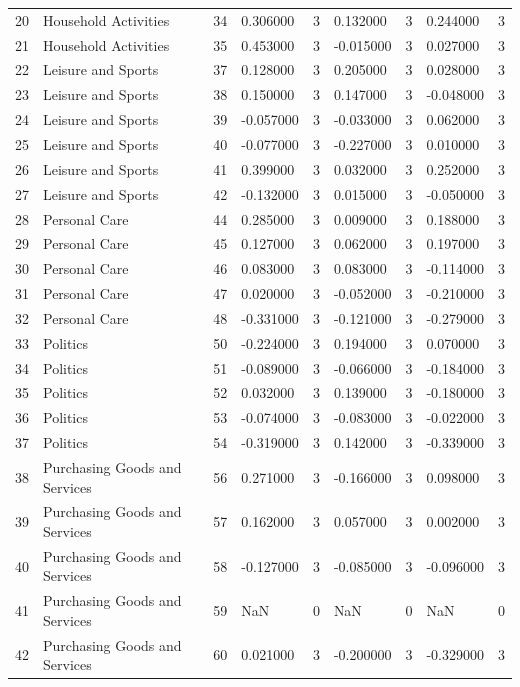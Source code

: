 \begin{tabular}{lllllllll}
20 & Household Activities & 34 & 0.306000 & 3 & 0.132000 & 3 & 0.244000 & 3 \\
21 & Household Activities & 35 & 0.453000 & 3 & -0.015000 & 3 & 0.027000 & 3 \\
22 & Leisure and Sports & 37 & 0.128000 & 3 & 0.205000 & 3 & 0.028000 & 3 \\
23 & Leisure and Sports & 38 & 0.150000 & 3 & 0.147000 & 3 & -0.048000 & 3 \\
24 & Leisure and Sports & 39 & -0.057000 & 3 & -0.033000 & 3 & 0.062000 & 3 \\
25 & Leisure and Sports & 40 & -0.077000 & 3 & -0.227000 & 3 & 0.010000 & 3 \\
26 & Leisure and Sports & 41 & 0.399000 & 3 & 0.032000 & 3 & 0.252000 & 3 \\
27 & Leisure and Sports & 42 & -0.132000 & 3 & 0.015000 & 3 & -0.050000 & 3 \\
28 & Personal Care & 44 & 0.285000 & 3 & 0.009000 & 3 & 0.188000 & 3 \\
29 & Personal Care & 45 & 0.127000 & 3 & 0.062000 & 3 & 0.197000 & 3 \\
30 & Personal Care & 46 & 0.083000 & 3 & 0.083000 & 3 & -0.114000 & 3 \\
31 & Personal Care & 47 & 0.020000 & 3 & -0.052000 & 3 & -0.210000 & 3 \\
32 & Personal Care & 48 & -0.331000 & 3 & -0.121000 & 3 & -0.279000 & 3 \\
33 & Politics & 50 & -0.224000 & 3 & 0.194000 & 3 & 0.070000 & 3 \\
34 & Politics & 51 & -0.089000 & 3 & -0.066000 & 3 & -0.184000 & 3 \\
35 & Politics & 52 & 0.032000 & 3 & 0.139000 & 3 & -0.180000 & 3 \\
36 & Politics & 53 & -0.074000 & 3 & -0.083000 & 3 & -0.022000 & 3 \\
37 & Politics & 54 & -0.319000 & 3 & 0.142000 & 3 & -0.339000 & 3 \\
38 & Purchasing Goods and Services & 56 & 0.271000 & 3 & -0.166000 & 3 & 0.098000 & 3 \\
39 & Purchasing Goods and Services & 57 & 0.162000 & 3 & 0.057000 & 3 & 0.002000 & 3 \\
40 & Purchasing Goods and Services & 58 & -0.127000 & 3 & -0.085000 & 3 & -0.096000 & 3 \\
41 & Purchasing Goods and Services & 59 & NaN & 0 & NaN & 0 & NaN & 0 \\
42 & Purchasing Goods and Services & 60 & 0.021000 & 3 & -0.200000 & 3 & -0.329000 & 3 \\

\end{tabular}
